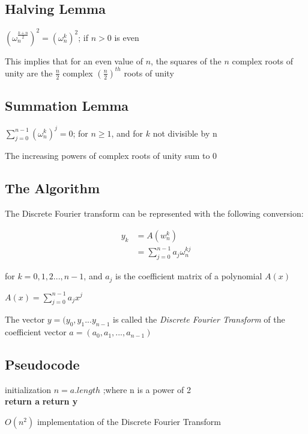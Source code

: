 \documentclass{article}
\begin{document}
\subsection{Halving Lemma}
\begin{center}
$(\omega_{n}^{\frac{k+n}{2}})^{2}=(\omega_{n}^{k})^{2}$; if $n>0$ is even
\end{center}
This implies that for an even value of $n$, the squares of the $n$ complex roots of unity are the $\frac{n}{2}$ complex $(\frac{n}{2})^{th}$ roots of unity

\subsection{Summation Lemma}
\begin{center}
$\sum_{j=0}^{n-1}(\omega_{n}^{k})^{j}=0$; for $n \geq 1$, and for $k$ not divisible by n
\end{center}
The increasing powers of complex roots of unity sum to 0

\subsection{The Algorithm}
The Discrete Fourier transform can be represented with the following conversion: \\
\begin{center}

\begin{align*}
y_{k}&=A(w_{n}^{k}) \\
&=\sum_{j=0}^{n-1}{a_{j}\omega_{n}^{kj}}
\end{align*}
\end{center}
for $k=0,1,2...,n-1$, and $a_{j}$ is the coefficient matrix of a polynomial $A(x)$ \\
\begin{center}
$A(x)=\sum_{j=0}^{n-1}{a_{j}x^{j}}$
\end{center}
The vector $y=(y_{0},y_{1}...y_{n-1}$ is called the \textit{Discrete Fourier Transform} of the coefficient vector $a=(a_{0}, a_{1},...,a_{n-1})$

\subsection{Pseudocode}
\begin{algorithm}[H]
 initialization\;
 $n=a.length$ ;where n is a power of 2  \\
  {
 	\textbf{return a}
 }{
 	\textbf{return y}
 }
 \caption{$O(n^{2})$ implementation of the Discrete Fourier Transform}
\end{algorithm}
\end{document}
